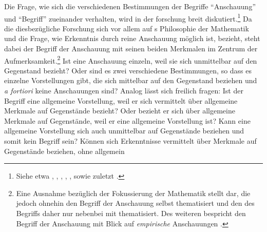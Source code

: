 Die Frage, wie sich die verschiedenen Bestimmungen der Begriffe
\enquote{Anschauung} und \enquote{Begriff} zueinander verhalten, wird in der
forschung breit diskutiert.\footnote{Siehe etwa
\cite{Hintikka:OnKantsNotionofIntuition1969},
\cite{Hintikka:KantianIntuitions1972},
\cite{Thompson:SingularTermsandIntuitioninKantsEpistemology1972},
\cite{Howell:IntuitionSynthesisandIndividuationintheCritiqueofPureReason1973},
\cite[][194--211]{Hanna:KantandtheFoundationsofAnalyticPhilosophy2001}, sowie
zuletzt \cite[][35--53]{Gruene:BlindeAnschauung2009}.} Da die diesbezügliche
Forschung sich vor allem auf s Philosophie der Mathematik
und die Frage, wie Erkenntnis durch reine Anschauung möglich ist, bezieht, steht
dabei der Begriff der Anschauung mit seinen beiden Merkmalen im Zentrum der
Aufmerksamkeit.\footnote{Eine Ausnahme bezüglich der Fokussierung der
Mathematik stellt \textcite[vgl.][35--53]{Gruene:BlindeAnschauung2009} dar, die
jedoch ohnehin den Begriff der Anschauung selbst thematisiert und den des
Begriffs daher nur nebenbei mit thematisiert. Des weiteren bespricht
 den
Begriff der Anschauung mit Blick auf \emph{empirische} Anschauungen
\parencite[vgl.][314]{Thompson:SingularTermsandIntuitioninKantsEpistemology1972}.}
Ist eine Anschauung einzeln, weil sie sich unmittelbar auf den Gegenstand
bezieht? Oder sind es zwei verschiedene Bestimmungen, so dass es einzelne
Vorstellungen gibt, die sich mittelbar auf den Gegenstand beziehen und \emph{a
fortiori} keine Anschauungen sind? Analog lässt sich freilich fragen: Ist der
Begriff eine allgemeine Vorstellung, weil er sich vermittelt über allgemeine
Merkmale auf Gegenstände bezieht? Oder bezieht er sich über allgemeine Merkmale
auf Gegenstände, weil er eine allgemeine Vorstellung ist? Kann eine allgemeine
Vorstellung sich auch unmittelbar auf Gegenstände beziehen und somit kein Begriff sein? Können sich
Erkenntnisse vermittelt über Merkmale auf Gegenstände beziehen, ohne allgemein
